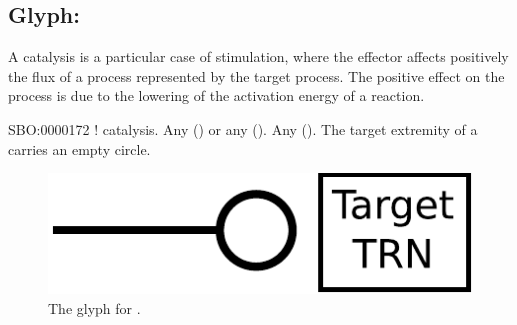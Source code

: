 \subsection{Glyph: }\label{sec:catalysis}

A catalysis is a particular case of stimulation, where the effector affects
positively the flux of a process represented by the target process. The positive effect on the process is due to the lowering of the activation energy of a reaction.

\begin{glyphDescription}
 \glyphSboTerm SBO:0000172 ! catalysis.
 \glyphOrigin Any  () or any  ().
 \glyphTarget Any  ().
 \glyphNode The target extremity of a  carries an empty circle.
 \end{glyphDescription}

\begin{figure}[H]
  \centering
  \includegraphics[scale = 0.5]{images/catalysis}
  \caption{The \PD glyph for .}
  \label{fig:catalysis}
\end{figure}



